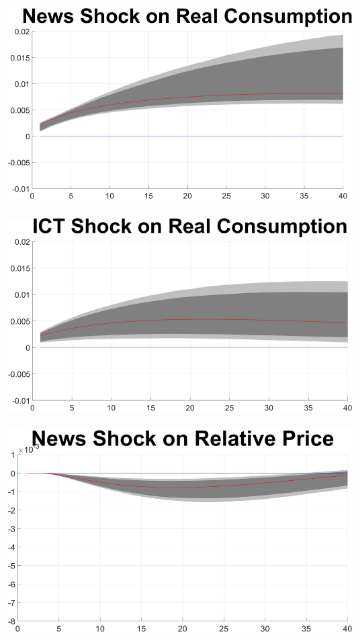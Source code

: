 \documentclass[12pt]{article}
\begin{document}
\begin{figure}[h!]
\begin{subfigure}{.5\textwidth}
\end{subfigure}
\begin{subfigure}{.5\textwidth}
	\centering
	\includegraphics[width=1\linewidth]{MainFigures/fig_News_Shock_on_Real_Consumption__controllinNEWS_}
\end{subfigure}%
\begin{subfigure}{.5\textwidth}
	\centering
	\includegraphics[width=1\linewidth]{MainFigures/fig_ICT_Shock_on_Real_Consumption__controllinNEWS_}
\end{subfigure}
\begin{subfigure}{.5\textwidth}
	\centering
	\includegraphics[width=1\linewidth]{MainFigures/fig_News_Shock_on_Relative_Price__controllinNEWS_}

\end{subfigure}
\end{figure}
\end{document}
